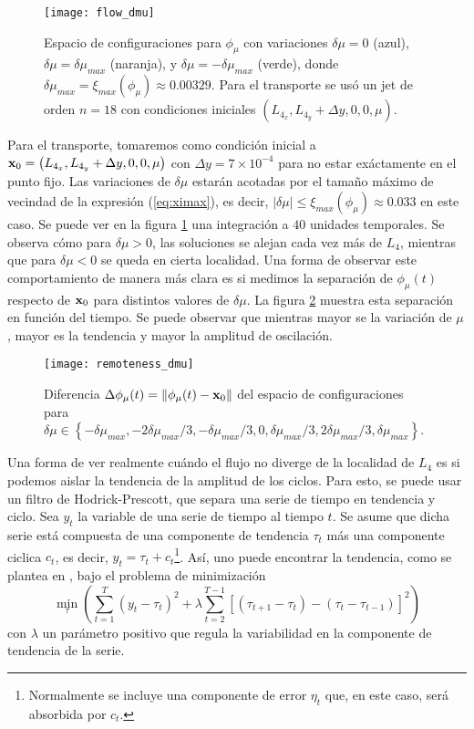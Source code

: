 \begin{figure}
 \centering
 \texttt{[image: flow\_dmu]}
 \caption{Espacio de configuraciones para $\phi_\mu$ con variaciones $\delta\mu = 0$ (azul), $\delta\mu = \delta\mu_{max}$ (naranja), y $\delta\mu = -\delta\mu_{max}$ (verde), donde $\delta\mu_{max} = \xi_{max}(\phi_\mu) \approx 0.00329$. Para el transporte se usó un jet de orden $n=18$ con condiciones iniciales $\left( L_{4_x}, L_{4_y} + \Delta y, 0, 0, \mu \right)$.}
 \label{fig:flow_dmu}
\end{figure}

Para el transporte, tomaremos como condición inicial a $\mathbf{x}_0 = \left( L_{4_x}, L_{4_y} + \Delta y, 0, 0, \mu \right)$ con $\Delta y = 7\times 10^{-4}$ para no estar exáctamente en el punto fijo. Las variaciones de $\delta\mu$ estarán acotadas por el tamaño máximo de vecindad de la expresión (\ref{eq:ximax}), es decir, $\lvert \delta\mu \rvert \leq  \xi_{max}(\phi_\mu) \approx 0.033$ en este caso. Se puede ver en la figura \ref{fig:flow_dmu} una integración a $40$ unidades temporales. Se observa cómo para $\delta \mu > 0$, las soluciones se alejan cada vez más de $L_4$, mientras que para $\delta \mu < 0$ se queda en cierta localidad. Una forma de observar este comportamiento de manera más clara es si medimos la separación de $\phi_\mu(t)$ respecto de $\mathbf{x}_0$ para distintos valores de $\delta \mu$. La figura \ref{fig:remoteness_dmu} muestra esta separación en función del tiempo. Se puede observar que mientras mayor se la variación de $\mu$, mayor es la tendencia y mayor la amplitud de oscilación. 

\begin{figure}
 \centering
 \texttt{[image: remoteness\_dmu]}
 \caption{Diferencia $\Delta\phi_\mu(t) = \left\lVert \phi_\mu(t) - \mathbf{x}_0 \right\rVert$ del espacio de configuraciones para $\delta\mu \in \left\lbrace -\delta\mu_{max}, -2\delta\mu_{max}/3, -\delta\mu_{max}/3, 0, \delta\mu_{max}/3, 2\delta\mu_{max}/3, \delta\mu_{max}  \right\rbrace$.}
 \label{fig:remoteness_dmu}
\end{figure}

Una forma de ver realmente cuándo el flujo no diverge de la localidad de $L_4$ es si podemos aislar la tendencia de la amplitud de los ciclos. Para esto, se puede usar un filtro de Hodrick-Prescott, que separa una serie de tiempo en tendencia y ciclo. Sea $y_t$ la variable de una serie de tiempo al tiempo $t$. Se asume que dicha serie está compuesta de una componente de tendencia $\tau_t$ más una componente ciclica $c_t$, es decir, $y_t = \tau_t + c_t$\footnote{Normalmente se incluye una componente de error $\eta_t$ que, en este caso, será absorbida por $c_t$.}. Así, uno puede encontrar la tendencia, como se plantea en \cite{Hodrick1997}, bajo el problema de minimización
\begin{equation}
 \min_{\tau} \left( \sum_{t=1}^T (y_t - \tau_t)^2 + \lambda \sum_{t=2}^{T-1} \left[ (\tau_{t+1} - \tau_t) - (\tau_t - \tau_{t-1}) \right]^2 \right)
 \label{eq:hp-filter}
\end{equation} 
con $\lambda$ un parámetro positivo que regula la variabilidad en la componente de tendencia de la serie.

